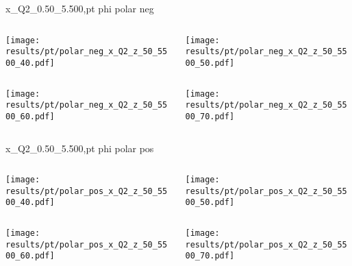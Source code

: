 \begin{frame}{x\_Q2\_0.50\_5.500,pt phi polar neg}
\begin{columns}
\begin{column}[T]{0.5\textwidth}
\texttt{[image: results/pt/polar\_neg\_x\_Q2\_z\_50\_5500\_40.pdf]}
\end{column}
\begin{column}[T]{0.5\textwidth}
\texttt{[image: results/pt/polar\_neg\_x\_Q2\_z\_50\_5500\_50.pdf]}
\end{column}
\end{columns}
\begin{columns}
\begin{column}[T]{0.5\textwidth}
\texttt{[image: results/pt/polar\_neg\_x\_Q2\_z\_50\_5500\_60.pdf]}
\end{column}
\begin{column}[T]{0.5\textwidth}
\texttt{[image: results/pt/polar\_neg\_x\_Q2\_z\_50\_5500\_70.pdf]}
\end{column}
\end{columns}
\end{frame}
\begin{frame}{x\_Q2\_0.50\_5.500,pt phi polar pos}
\begin{columns}
\begin{column}[T]{0.5\textwidth}
\texttt{[image: results/pt/polar\_pos\_x\_Q2\_z\_50\_5500\_40.pdf]}
\end{column}
\begin{column}[T]{0.5\textwidth}
\texttt{[image: results/pt/polar\_pos\_x\_Q2\_z\_50\_5500\_50.pdf]}
\end{column}
\end{columns}
\begin{columns}
\begin{column}[T]{0.5\textwidth}
\texttt{[image: results/pt/polar\_pos\_x\_Q2\_z\_50\_5500\_60.pdf]}
\end{column}
\begin{column}[T]{0.5\textwidth}
\texttt{[image: results/pt/polar\_pos\_x\_Q2\_z\_50\_5500\_70.pdf]}
\end{column}
\end{columns}
\end{frame}
